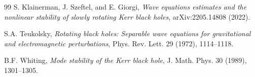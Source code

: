 \documentclass[12pt,a4paper]{article}
\begin{document}
\begin{thebibliography}{99}
S. Klainerman, J. Szeftel, and E. Giorgi, \textit{Wave equations estimates and the nonlinear stability of slowly rotating Kerr black holes}, arXiv:2205.14808 (2022).

S.A. Teukolsky, \textit{Rotating black holes: Separable wave equations for gravitational and electromagnetic perturbations}, Phys. Rev. Lett. 29 (1972), 1114--1118.

B.F. Whiting, \textit{Mode stability of the Kerr black hole}, J. Math. Phys. 30 (1989), 1301--1305.

\end{thebibliography}
\end{document}
